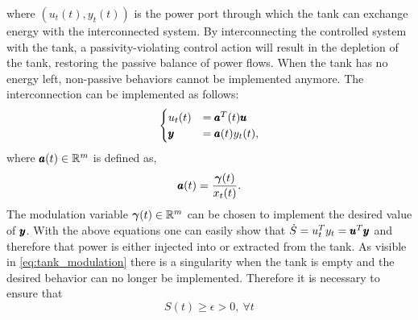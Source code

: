 where $(u_t(t), y_t(t))$ is the power port through which the tank can exchange energy with the interconnected system. By interconnecting the controlled system with the tank, a passivity-violating control action will result in the depletion of the tank, restoring the passive balance of power flows. When the tank has no energy left, non-passive behaviors cannot be implemented anymore. The interconnection can be implemented as follows:
\begin{equation}
\begin{cases}
    u_t(t) &= \pmb{a}^T(t) \pmb{u} \\
    \pmb{y} &= \pmb{a}(t) y_t(t),
\end{cases}
\end{equation}
where $\pmb{a}(t) \in \mathbb{R}^{m}$ is defined as,
\begin{equation} \label{eq:tank_modulation}
    \pmb{a}(t) = \frac{\boldsymbol{\gamma}(t)}{x_t(t)}.
\end{equation}
The modulation variable $\boldsymbol{\gamma}(t) \in \mathbb{R}^{m}$ can be chosen to implement the desired value of $\pmb{y}$. With the above equations one can easily show that $\dot{S} = u_t^T y_t = \pmb{u}^T \pmb{y}$ and therefore that power is either injected into or extracted from the tank. As visible in \eqref{eq:tank_modulation} there is a singularity when the tank is empty and the desired behavior can no longer be implemented. 
Therefore it is necessary to ensure that 
\begin{equation}
 S(t) \geq \epsilon > 0, \ \forall t   
\end{equation}